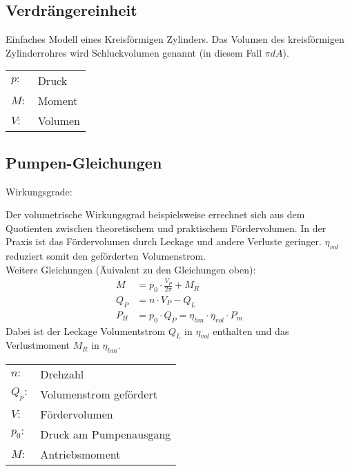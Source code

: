 \subsection{Verdrängereinheit}
Einfaches Modell eines Kreisförmigen Zylinders. Das Volumen des kreisförmigen Zylinderrohres wird Schluckvolumen genannt (in diesem Fall $\pi  d  A$). 
\begin{tabular}{ll}
$p:$ & Druck \\
$M:$ & Moment \\
$V:$ & Volumen
\end{tabular}


\subsection{Pumpen-Gleichungen}
Wirkungsgrade:

Der volumetrische Wirkungsgrad beispielsweise errechnet sich aus dem Quotienten zwischen theoretischem und praktischem Fördervolumen. In der Praxis ist das Fördervolumen durch Leckage und andere Verluste geringer. $\eta_{vol}$ reduziert somit den geförderten Volumenstrom. \\

Weitere Gleichungen (Äuivalent zu den Gleichungen oben):
\begin{align*}
M &= p_0 \cdot \frac{V_P}{2 \pi} + M_R \tag{Pumpenmoment} \\
Q_P &= n \cdot V_P - Q_L \tag{Volumenstrom} \\
P_H &= p_0 \cdot Q_P = \eta_{hm} \cdot \eta_{vol} \cdot P_m \tag{Leistung}
\end{align*}
Dabei ist der Leckage Volumentstrom $Q_L$ in $\eta_{vol}$ enthalten und das Verlustmoment $M_R$ in $\eta_{hm}$.

\begin{tabular}{ll}
$n:$ & Drehzahl \\
$Q_p:$ & Volumenstrom gefördert\\
$V:$ & Fördervolumen \\
$p_0:$ & Druck am Pumpenausgang \\
$M:$ & Antriebsmoment
\end{tabular}

